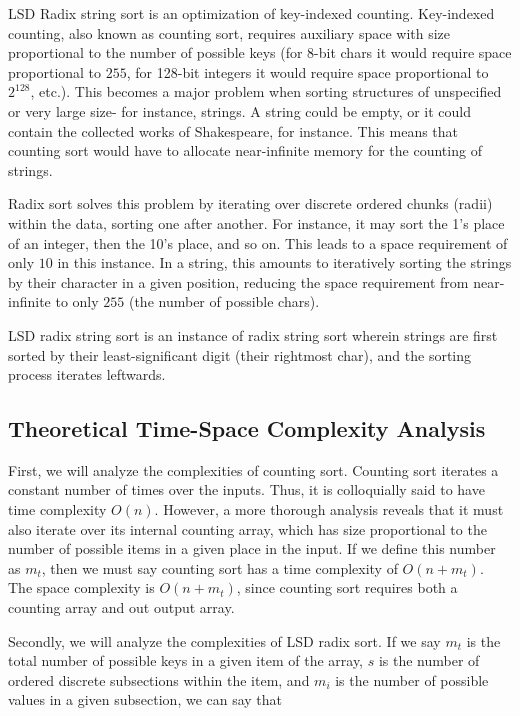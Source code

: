 \documentclass[12pt]{amsart}
\begin{document}
    LSD Radix string sort is an optimization of key-indexed
    counting. Key-indexed counting, also known as counting sort,
    requires auxiliary space with size proportional to the
    number of possible keys (for 8-bit chars it would require
    space proportional to $255$, for 128-bit integers it would
    require space proportional to $2^{128}$, etc.). This
    becomes a major problem when sorting structures of
    unspecified or very large size- for instance, strings. A
    string could be empty, or it could contain the collected
    works of Shakespeare, for instance. This means that counting
    sort would have to allocate near-infinite memory for the
    counting of strings.

    Radix sort solves this problem by iterating over discrete
    ordered chunks (radii) within the data, sorting one after
    another. For instance, it may sort the 1's place of an
    integer, then the 10's place, and so on. This leads to a
    space requirement of only $10$ in this instance. In a
    string, this amounts to iteratively sorting the strings by
    their character in a given position, reducing the space
    requirement from near-infinite to only $255$ (the number of
    possible chars).

    LSD radix string sort is an instance of radix string sort
    wherein strings are first sorted by their least-significant
    digit (their rightmost char), and the sorting process
    iterates leftwards.

    \subsection{Theoretical Time-Space Complexity Analysis}

    First, we will analyze the complexities of counting sort.
    Counting sort iterates a constant number of times over the
    inputs. Thus, it is colloquially said to have time
    complexity $O(n)$. However, a more thorough analysis reveals
    that it must also iterate over its internal counting array,
    which has size proportional to the number of possible items
    in a given place in the input. If we define this number as
    $m_t$, then we must say counting sort has a time complexity of
    $O(n + m_t)$. The space complexity is $O(n + m_t)$, since
    counting sort requires both a counting array and out output
    array.

    Secondly, we will analyze the complexities of LSD radix
    sort. If we say $m_t$ is the total number of possible keys
    in a given item of the array, $s$ is the number of ordered
    discrete subsections within the item, and $m_i$ is the
    number of possible values in a given subsection, we can say
    that
\end{document}
